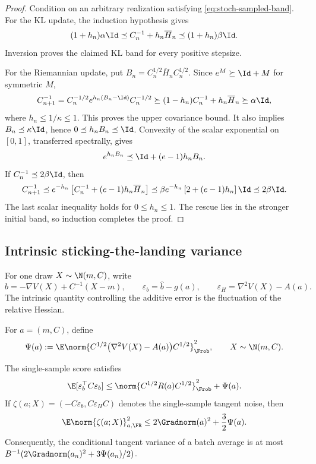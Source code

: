 \begin{proof}
Condition on an arbitrary realization satisfying
\eqref{eq:stoch-sampled-band}.  For the KL update, the induction hypothesis
gives
\[
  (1+h_n)\alpha\Id
  \preceq C_n^{-1}+h_n\overline H_n
  \preceq(1+h_n)\beta\Id.
\]
Inversion proves the claimed KL band for every positive stepsize.

For the Riemannian update, put
\(B_n=C_n^{1/2}\overline H_nC_n^{1/2}\).  Since
\(e^M\succeq\Id+M\) for symmetric \(M\),
\[
  C_{n+1}^{-1}
  =C_n^{-1/2}e^{h_n(B_n-\Id)}C_n^{-1/2}
  \succeq(1-h_n)C_n^{-1}+h_n\overline H_n
  \succeq\alpha\Id,
\]
where \(h_n\leq1/\kappa\leq1\).  This proves the upper covariance bound.
It also implies \(B_n\preceq\kappa\Id\), hence
\(0\preceq h_nB_n\preceq\Id\).  Convexity of the scalar exponential on
\([0,1]\), transferred spectrally, gives
\[
  e^{h_nB_n}\preceq\Id+(e-1)h_nB_n.
\]
If \(C_n^{-1}\preceq2\beta\Id\), then
\[
  C_{n+1}^{-1}
  \preceq e^{-h_n}
  \left[C_n^{-1}+(e-1)h_n\overline H_n\right]
  \preceq\beta e^{-h_n}\left[2+(e-1)h_n\right]\Id
  \preceq2\beta\Id.
\]
The last scalar inequality holds for \(0\leq h_n\leq1\).  The rescue lies
in the stronger initial band, so induction completes the proof.
\end{proof}

\subsection{Intrinsic sticking-the-landing variance}
\label{sec:stoch-variance}

For one draw \(X\sim\N(m,C)\), write
\[
  \widehat b=-\nabla V(X)+C^{-1}(X-m),
  \qquad
  \varepsilon_b=\widehat b-g(a),
  \qquad
  \varepsilon_H=\nabla^2V(X)-A(a).
\]
The intrinsic quantity controlling the additive error is the fluctuation of
the relative Hessian.

\begin{definition}
\label{def:stoch-intrinsic-fluctuation}
For \(a=(m,C)\), define
\begin{equation}
  \Psi(a)
  :=\E\norm{
    C^{1/2}\bigl(\nabla^2V(X)-A(a)\bigr)C^{1/2}
  }_{\Frob}^2,
  \qquad X\sim\N(m,C).
  \label{eq:stoch-Psi}
\end{equation}
\end{definition}

\begin{lemma}
\label{lem:stoch-intrinsic-variance}
The single-sample score satisfies
\begin{equation}
  \E[\varepsilon_b^\top C\varepsilon_b]
  \leq
  \norm{C^{1/2}R(a)C^{1/2}}_{\Frob}^2+\Psi(a).
  \label{eq:stoch-score-variance}
\end{equation}
If \(\zeta(a;X)=(-C\varepsilon_b,C\varepsilon_HC)\) denotes the
single-sample tangent noise, then
\begin{equation}
  \E\norm{\zeta(a;X)}_{a,\FR}^2
  \leq2\Gradnorm(a)^2+\frac32\Psi(a).
  \label{eq:stoch-tangent-variance}
\end{equation}
Consequently, the conditional tangent variance of a batch average is at
most \(B^{-1}(2\Gradnorm(a_n)^2+3\Psi(a_n)/2)\).
\end{lemma}

